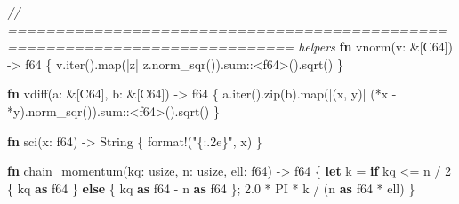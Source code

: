 \documentclass[
  10pt,
]{article}
\newenvironment{Shaded}{}{}
\newcommand{\CommentTok}[1]{\textcolor[rgb]{0.38,0.63,0.69}{\textit{#1}}}
\newcommand{\ControlFlowTok}[1]{\textcolor[rgb]{0.00,0.44,0.13}{\textbf{#1}}}
\newcommand{\DataTypeTok}[1]{\textcolor[rgb]{0.56,0.13,0.00}{#1}}
\newcommand{\DecValTok}[1]{\textcolor[rgb]{0.25,0.63,0.44}{#1}}
\newcommand{\KeywordTok}[1]{\textcolor[rgb]{0.00,0.44,0.13}{\textbf{#1}}}
\newcommand{\NormalTok}[1]{#1}
\newcommand{\OperatorTok}[1]{\textcolor[rgb]{0.40,0.40,0.40}{#1}}
\newcommand{\PreprocessorTok}[1]{\textcolor[rgb]{0.74,0.48,0.00}{#1}}
\newcommand{\StringTok}[1]{\textcolor[rgb]{0.25,0.44,0.63}{#1}}
\begin{document}
\begin{Shaded}
\begin{Highlighting}[]
\CommentTok{// ============================================================================ helpers}
\KeywordTok{fn}\NormalTok{ vnorm(v}\OperatorTok{:} \OperatorTok{\&}\NormalTok{[C64]) }\OperatorTok{{-}\textgreater{}} \DataTypeTok{f64} \OperatorTok{\{}
\NormalTok{    v}\OperatorTok{.}\NormalTok{iter()}\OperatorTok{.}\NormalTok{map(}\OperatorTok{|}\NormalTok{z}\OperatorTok{|}\NormalTok{ z}\OperatorTok{.}\NormalTok{norm\_sqr())}\OperatorTok{.}\PreprocessorTok{sum::}\OperatorTok{\textless{}}\DataTypeTok{f64}\OperatorTok{\textgreater{}}\NormalTok{()}\OperatorTok{.}\NormalTok{sqrt()}
\OperatorTok{\}}

\KeywordTok{fn}\NormalTok{ vdiff(a}\OperatorTok{:} \OperatorTok{\&}\NormalTok{[C64]}\OperatorTok{,}\NormalTok{ b}\OperatorTok{:} \OperatorTok{\&}\NormalTok{[C64]) }\OperatorTok{{-}\textgreater{}} \DataTypeTok{f64} \OperatorTok{\{}
\NormalTok{    a}\OperatorTok{.}\NormalTok{iter()}\OperatorTok{.}\NormalTok{zip(b)}\OperatorTok{.}\NormalTok{map(}\OperatorTok{|}\NormalTok{(x}\OperatorTok{,}\NormalTok{ y)}\OperatorTok{|}\NormalTok{ (}\OperatorTok{*}\NormalTok{x }\OperatorTok{{-}} \OperatorTok{*}\NormalTok{y)}\OperatorTok{.}\NormalTok{norm\_sqr())}\OperatorTok{.}\PreprocessorTok{sum::}\OperatorTok{\textless{}}\DataTypeTok{f64}\OperatorTok{\textgreater{}}\NormalTok{()}\OperatorTok{.}\NormalTok{sqrt()}
\OperatorTok{\}}

\KeywordTok{fn}\NormalTok{ sci(x}\OperatorTok{:} \DataTypeTok{f64}\NormalTok{) }\OperatorTok{{-}\textgreater{}} \DataTypeTok{String} \OperatorTok{\{}
    \PreprocessorTok{format!}\NormalTok{(}\StringTok{"\{:.2e\}"}\OperatorTok{,}\NormalTok{ x)}
\OperatorTok{\}}

\KeywordTok{fn}\NormalTok{ chain\_momentum(kq}\OperatorTok{:} \DataTypeTok{usize}\OperatorTok{,}\NormalTok{ n}\OperatorTok{:} \DataTypeTok{usize}\OperatorTok{,}\NormalTok{ ell}\OperatorTok{:} \DataTypeTok{f64}\NormalTok{) }\OperatorTok{{-}\textgreater{}} \DataTypeTok{f64} \OperatorTok{\{}
    \KeywordTok{let}\NormalTok{ k }\OperatorTok{=} \ControlFlowTok{if}\NormalTok{ kq }\OperatorTok{\textless{}=}\NormalTok{ n }\OperatorTok{/} \DecValTok{2} \OperatorTok{\{}\NormalTok{ kq }\KeywordTok{as} \DataTypeTok{f64} \OperatorTok{\}} \ControlFlowTok{else} \OperatorTok{\{}\NormalTok{ kq }\KeywordTok{as} \DataTypeTok{f64} \OperatorTok{{-}}\NormalTok{ n }\KeywordTok{as} \DataTypeTok{f64} \OperatorTok{\};}
    \DecValTok{2.0} \OperatorTok{*}\NormalTok{ PI }\OperatorTok{*}\NormalTok{ k }\OperatorTok{/}\NormalTok{ (n }\KeywordTok{as} \DataTypeTok{f64} \OperatorTok{*}\NormalTok{ ell)}
\OperatorTok{\}}


\end{Highlighting}
\end{Shaded}
\end{document}
